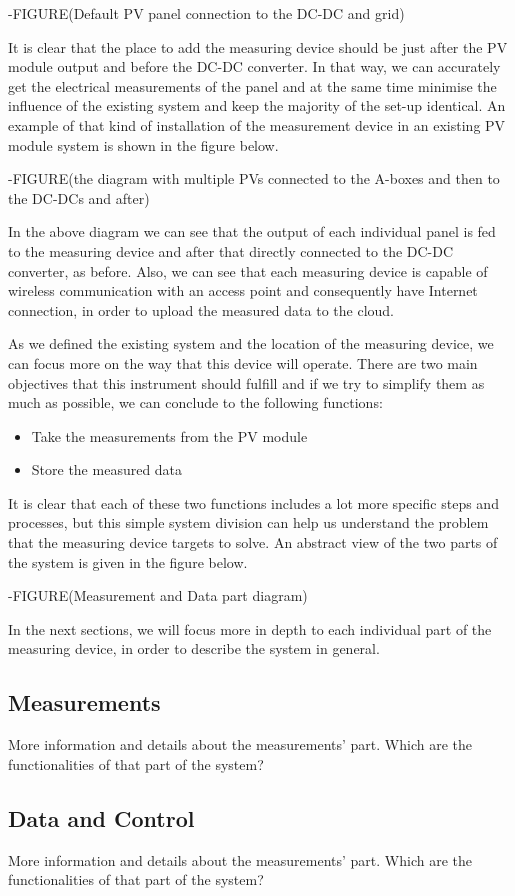  -FIGURE(Default PV panel connection to the DC-DC and grid)
 
 It is clear that the place to add the measuring device should be just after the PV module output and before the DC-DC converter. In that way, we can accurately get the electrical measurements of the panel and at the same time minimise the influence of the existing system and keep the majority of the set-up identical. An example of that kind of  installation of the measurement device in an existing PV module system is shown in the figure below.
 
 -FIGURE(the diagram with multiple PVs connected to the A-boxes and then to the DC-DCs and after)
 
 In the above diagram we can see that the output of each individual panel is fed to the measuring device and after that directly connected to the DC-DC converter, as before. Also, we can see that each measuring device is capable of wireless communication with an access point and consequently have Internet connection, in order to upload the measured data to the cloud.
 
 As we defined the existing system and the location of the measuring device, we can focus more on the way that this device will operate. There are two main objectives that this instrument should fulfill and if we try to simplify them as much as possible, we can conclude to the following functions:
 
\begin{itemize}
 \item Take the measurements from the PV module
 \item Store the measured data
\end{itemize}
 
It is clear that each of these two functions includes a lot more specific steps and processes, but this simple system division can help us understand the problem that the measuring device targets to solve. An abstract view of the two parts of the system is given in the figure below.

-FIGURE(Measurement and Data part diagram)

In the next sections, we will focus more in depth to each individual part of the measuring device, in order to describe the system in general. 

\subsection{Measurements}
More information and details about the measurements' part.
Which are the functionalities of that part of the system?

\subsection{Data and Control}
More information and details about the measurements' part.
Which are the functionalities of that part of the system?